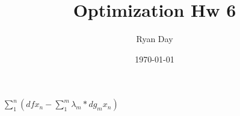 \documentclass[a4paper]{article}
\author{Ryan Day}
\title{Optimization Hw 6}
\date{\today}
\begin{document}
\maketitle

$\sum_{1}^{n}(dfx_{n} - \sum_{1}^{m}\lambda_{m}*dg_{m}x_{n})$
\end{document}
